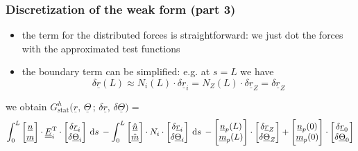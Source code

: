 \begin{frame}
  \frametitle{Discretization of the weak form (part 3)}
  
  \begin{itemize}
    \item the term for the distributed forces is straightforward: \newline
       we just dot the forces with the approximated test functions
    \item the boundary term can be simplified: e.g. at $s=L$ we have
      \begin{displaymath}
        \delta \underline{r}(L) \approx N_i(L) \cdot \delta \underline{r}_i = N_Z(L) \cdot \delta \underline{r}_Z = \delta \underline{r}_Z
      \end{displaymath}
  \end{itemize}

  we obtain $G_{\text{stat}}^h \bigl( \underline{r}, \, \underline{\Theta} \, ; \, \delta \underline{r}, \, \delta \underline{\Theta} \bigr) =$
  \begin{displaymath}
    \int_0^L
        \begin{bmatrix}
          \underline{n} \\ \underline{m}
        \end{bmatrix}
        \cdot \doubleunderline{E}_i^{\mathrm{T}} \cdot
        \begin{bmatrix}
          \delta \underline{r}_i \\ \delta \underline{\Theta}_i
        \end{bmatrix}
      \: \dif s \:
      - \int_0^L
        \begin{bmatrix}
          \underline{\hat{n}} \\ \underline{\hat{m}}
        \end{bmatrix} \cdot N_i \cdot
        \begin{bmatrix}
          \delta \underline{r}_i \\ \delta \underline{\Theta}_i
        \end{bmatrix}
      \: \dif s \:
      - \begin{bmatrix}
          \underline{n}_p(L) \\ \underline{m}_p(L)
      \end{bmatrix} \cdot
      \begin{bmatrix}
          \delta \underline{r}_Z \\ \delta \underline{\Theta}_Z
      \end{bmatrix}
      + \begin{bmatrix}
          \underline{n}_p(0) \\ \underline{m}_p(0)
      \end{bmatrix} \cdot
      \begin{bmatrix}
          \delta \underline{r}_0 \\ \delta \underline{\Theta}_0
      \end{bmatrix}
  \end{displaymath}
  

\end{frame}
